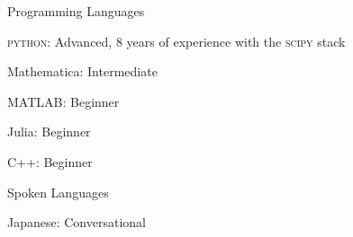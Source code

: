 


\begin{cventries}

  \cventry
  {Programming Languages}
  {}
  {}
  {}
  {
    \begin{cvitems}
    \item {\textsc{python}: Advanced, 8 years of experience with the \textsc{scipy} stack}
    \item {Mathematica: Intermediate}
    \item {\textsc{MATLAB}: Beginner}
    \item {Julia: Beginner}
      \item {C++: Beginner}
        \end{cvitems}
}

\cventry
{Spoken Languages}
{}
{}
{}
{
    \begin{cvitems}
    \item {Japanese: Conversational}
    \end{cvitems}
    }
    


\end{cventries}
